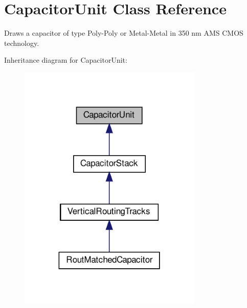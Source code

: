 \hypertarget{classpython_1_1capacitorunit_1_1CapacitorUnit}{}\section{Capacitor\+Unit Class Reference}
\label{classpython_1_1capacitorunit_1_1CapacitorUnit}


Draws a capacitor of type Poly-\/\+Poly or Metal-\/\+Metal in 350 nm A\+MS C\+M\+OS technology.  




Inheritance diagram for Capacitor\+Unit\+:\nopagebreak
\begin{figure}[H]
\begin{center}
\leavevmode
\includegraphics[width=249pt]{classpython_1_1capacitorunit_1_1CapacitorUnit__inherit__graph}
\end{center}
\end{figure}
